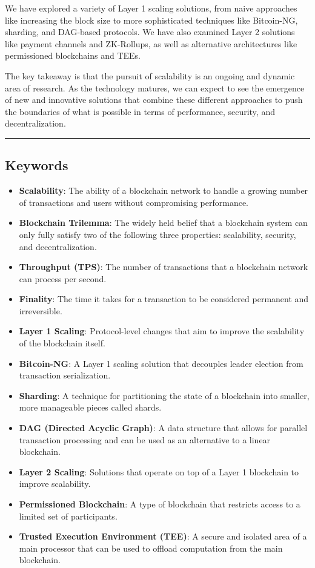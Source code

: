 We have explored a variety of Layer 1 scaling solutions, from naive
approaches like increasing the block size to more sophisticated
techniques like Bitcoin-NG, sharding, and DAG-based protocols. We have
also examined Layer 2 solutions like payment channels and ZK-Rollups, as
well as alternative architectures like permissioned blockchains and
TEEs.

The key takeaway is that the pursuit of scalability is an ongoing and
dynamic area of research. As the technology matures, we can expect to
see the emergence of new and innovative solutions that combine these
different approaches to push the boundaries of what is possible in terms
of performance, security, and decentralization.

\begin{center}\rule{0.5\linewidth}{0.5pt}\end{center}

\subsection{Keywords}\label{keywords}

\begin{itemize}
\tightlist
\item
  \textbf{Scalability}: The ability of a blockchain network to handle a
  growing number of transactions and users without compromising
  performance.
\item
  \textbf{Blockchain Trilemma}: The widely held belief that a blockchain
  system can only fully satisfy two of the following three properties:
  scalability, security, and decentralization.
\item
  \textbf{Throughput (TPS)}: The number of transactions that a
  blockchain network can process per second.
\item
  \textbf{Finality}: The time it takes for a transaction to be
  considered permanent and irreversible.
\item
  \textbf{Layer 1 Scaling}: Protocol-level changes that aim to improve
  the scalability of the blockchain itself.
\item
  \textbf{Bitcoin-NG}: A Layer 1 scaling solution that decouples leader
  election from transaction serialization.
\item
  \textbf{Sharding}: A technique for partitioning the state of a
  blockchain into smaller, more manageable pieces called shards.
\item
  \textbf{DAG (Directed Acyclic Graph)}: A data structure that allows
  for parallel transaction processing and can be used as an alternative
  to a linear blockchain.
\item
  \textbf{Layer 2 Scaling}: Solutions that operate on top of a Layer 1
  blockchain to improve scalability.
\item
  \textbf{Permissioned Blockchain}: A type of blockchain that restricts
  access to a limited set of participants.
\item
  \textbf{Trusted Execution Environment (TEE)}: A secure and isolated
  area of a main processor that can be used to offload computation from
  the main blockchain.
\end{itemize}

